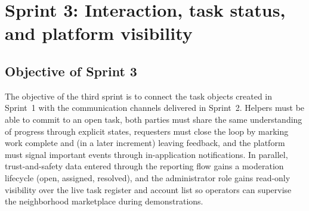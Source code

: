 \documentclass[11pt,a4paper]{article}
\begin{document}
\section{Sprint 3: Interaction, task status, and platform visibility}

\subsection{Objective of Sprint 3}
The objective of the third sprint is to connect the task objects created in Sprint~1 with the communication channels delivered in Sprint~2. Helpers must be able to commit to an open task, both parties must share the same understanding of progress through explicit states, requesters must close the loop by marking work complete and (in a later increment) leaving feedback, and the platform must signal important events through in-application notifications. In parallel, trust-and-safety data entered through the reporting flow gains a moderation lifecycle (open, assigned, resolved), and the administrator role gains read-only visibility over the live task register and account list so operators can supervise the neighborhood marketplace during demonstrations.
\end{document}
